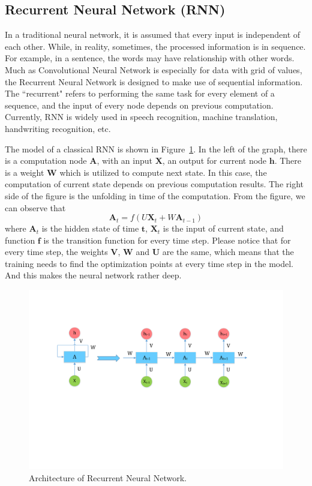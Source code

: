 \subsection{Recurrent Neural Network (RNN)}

In a traditional neural network, it is assumed that every input is independent of each other. While, in reality, sometimes, the processed information is in sequence. For example, in a sentence, the words may have relationship with other words. Much as Convolutional Neural Network is especially for data with grid of values, the Recurrent Neural Network is designed to make use of sequential information. The ``recurrent" refers to performing the same task for every element of a sequence, and the input of every node depends on previous computation. Currently, RNN is widely used in speech recognition, machine translation, handwriting recognition, etc.

The model of a classical RNN is shown in Figure~\ref{fig:rnn}. In the left of the graph, there is a computation node $\textbf{A}$, with an input $\textbf{X}$, an output for current node $\textbf{h}$. There is a weight $\textbf{W}$ which is utilized to compute next state. In this case, the computation of current state depends on previous computation results. The right side of the figure is the unfolding in time of the computation. From the figure, we can observe that
$$\textbf{A}_t = f(U\textbf{X}_t + W\textbf{A}_{t-1})$$
where $\textbf{A}_t$ is the hidden state of time $\textbf{t}$, $\textbf{X}_t$ is the input of current state, and function $\textbf{f}$ is the transition function for every time step. Please notice that for every time step, the weights $\textbf{V}$, $\textbf{W}$ and $\textbf{U}$ are the same, which means that the training needs to find the optimization points at every time step in the model. And this makes the neural network rather deep.

\begin{figure}
\centering
\includegraphics[scale=0.6]{figure/rnn.pdf}
\caption{Architecture of Recurrent Neural Network.}
\label{fig:rnn}
\end{figure}

